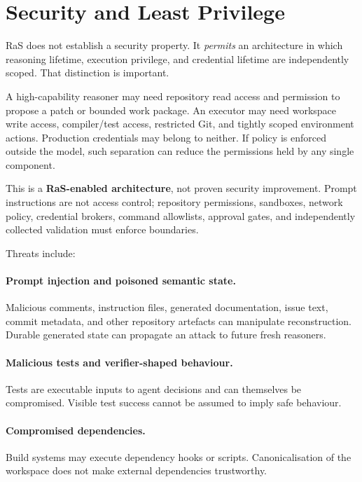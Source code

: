 \section{Security and Least Privilege}
\label{sec:security}

RaS does not establish a security property. It \emph{permits} an architecture in which reasoning lifetime, execution privilege, and credential lifetime are independently scoped. That distinction is important.

A high-capability reasoner may need repository read access and permission to propose a patch or bounded work package. An executor may need workspace write access, compiler/test access, restricted Git, and tightly scoped environment actions. Production credentials may belong to neither. If policy is enforced outside the model, such separation can reduce the permissions held by any single component.

This is a \textbf{RaS-enabled architecture}, not proven security improvement. Prompt instructions are not access control; repository permissions, sandboxes, network policy, credential brokers, command allowlists, approval gates, and independently collected validation must enforce boundaries.

Threats include:

\paragraph{Prompt injection and poisoned semantic state.}
Malicious comments, instruction files, generated documentation, issue text, commit metadata, and other repository artefacts can manipulate reconstruction. Durable generated state can propagate an attack to future fresh reasoners.

\paragraph{Malicious tests and verifier-shaped behaviour.}
Tests are executable inputs to agent decisions and can themselves be compromised. Visible test success cannot be assumed to imply safe behaviour.

\paragraph{Compromised dependencies.}
Build systems may execute dependency hooks or scripts. Canonicalisation of the workspace does not make external dependencies trustworthy.

